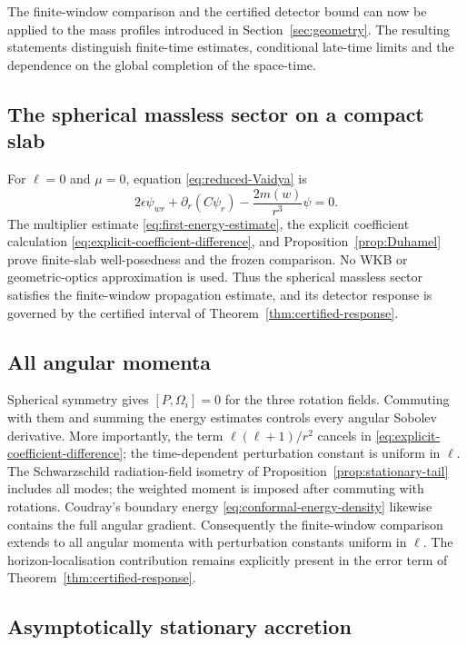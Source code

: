\documentclass[11pt,a4paper]{article}
\theoremstyle{definition}
\theoremstyle{remark}
\begin{document}
	The finite-window comparison and the certified detector bound can now be
	applied to the mass profiles introduced in Section~\ref{sec:geometry}.  The
	resulting statements distinguish finite-time estimates, conditional
	late-time limits and the dependence on the global completion of the
	space-time.
	
	\subsection{The spherical massless sector on a compact slab}
	
	For $\ell=0$ and $\mu=0$, equation \eqref{eq:reduced-Vaidya} is
	\begin{equation}
		2\epsilon\psi_{wr}+\partial_r(C\psi_r)-\frac{2m(w)}{r^3}\psi=0.
	\end{equation}
	The multiplier estimate \eqref{eq:first-energy-estimate}, the explicit
	coefficient calculation \eqref{eq:explicit-coefficient-difference}, and
	Proposition~\ref{prop:Duhamel} prove finite-slab well-posedness and the frozen
	comparison.  No WKB or geometric-optics approximation is used.  Thus the
	spherical massless sector satisfies the finite-window propagation estimate,
	and its detector response is governed by the certified interval of
	Theorem~\ref{thm:certified-response}.
	
	\subsection{All angular momenta}
	
	Spherical symmetry gives $[P,\Omega_i]=0$ for the three rotation fields.
	Commuting with them and summing the energy estimates controls every angular
	Sobolev derivative.  More importantly, the term
	$\ell(\ell+1)/r^2$ cancels in \eqref{eq:explicit-coefficient-difference}; the
	time-dependent perturbation constant is uniform in $\ell$.  The Schwarzschild
	radiation-field isometry of Proposition~\ref{prop:stationary-tail} includes
	all modes; the weighted moment is imposed after commuting with rotations.
	Coudray's
	boundary energy \eqref{eq:conformal-energy-density} likewise contains the
	full angular gradient.  Consequently the finite-window comparison extends to
	all angular momenta with perturbation constants uniform in $\ell$.  The
	horizon-localisation contribution remains explicitly present in the error
	term of Theorem~\ref{thm:certified-response}.
	
	\subsection{Asymptotically stationary accretion}
	
\end{document}
